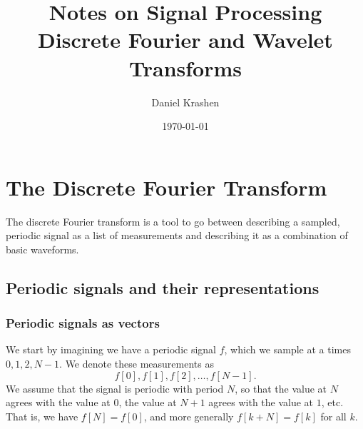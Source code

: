 \documentclass[12pt]{report}
\theoremstyle{plain}
\begin{document}


\author{Daniel Krashen}
\title{Notes on Signal Processing\\Discrete Fourier and Wavelet Transforms}
\date{\today}

\maketitle
\tableofcontents

\chapter{The Discrete Fourier Transform}
The discrete Fourier transform is a tool to go between describing a sampled, periodic signal as a list of measurements and describing it as a combination of basic waveforms.

\section{Periodic signals and their representations}

\subsection{Periodic signals as vectors}
We start by imagining we have a periodic signal $f$, which we sample at a times $0, 1, 2, N-1$. We denote these measurements as
\[ f[0], f[1], f[2], \ldots, f[N-1]. \]
We assume that the signal is periodic with period $N$, so that the value at $N$ agrees with the value at $0$, the value at $N+1$ agrees with the value at $1$, etc. That is, we have $f[N] = f[0]$, and more generally $f[k + N] = f[k]$ for all $k$.
\end{document}
